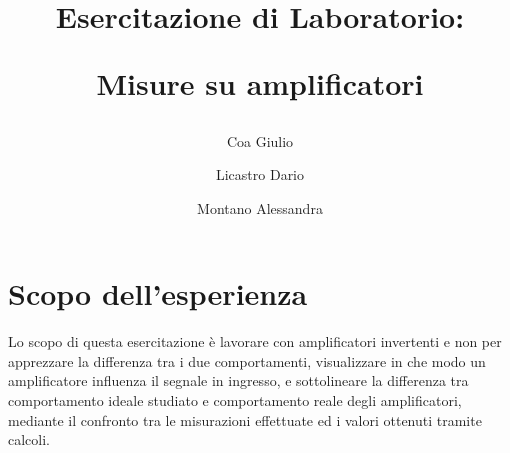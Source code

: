 \documentclass[a4paper]{article}
\title{
	\begin{center}
		Esercitazione di Laboratorio:
	\end{center}
	\newline
	\begin{center}
		Misure su amplificatori
	\end{center}
}
\author{
	Coa Giulio
	\and
	Licastro Dario
	\and
	Montano Alessandra
}
\begin{document}
	\begin{titlingpage}
		\maketitle
	\end{titlingpage}
	\newpage
	\section{Scopo dell'esperienza}
		Lo scopo di questa esercitazione è lavorare con amplificatori invertenti e non per apprezzare la differenza tra i due comportamenti, visualizzare in che modo un amplificatore influenza il segnale in ingresso, e sottolineare la differenza tra comportamento ideale studiato e comportamento reale degli amplificatori, mediante il confronto tra le misurazioni effettuate ed i valori ottenuti tramite calcoli.
\end{document}
